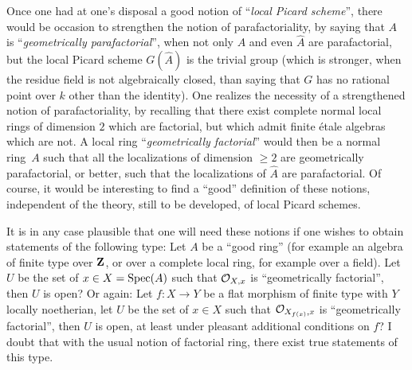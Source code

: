 \label{pXIII20}%
Once one had at one's disposal a good notion of ``\emph{local Picard scheme}'', there would be occasion to strengthen the notion of parafactoriality, by saying that $A$ is ``\emph{geometrically parafactorial}'', when not only $A$ and even $\widehat{A}$ are parafactorial, but the local Picard scheme $G(\widehat{A})$ is the trivial group (which is stronger, when the residue field is not algebraically closed, than saying that $G$ has no rational point over $k$ other than the identity). One realizes the necessity of a strengthened notion of parafactoriality, by recalling that there exist complete normal local rings of dimension $2$ which are factorial, but which admit finite \'etale algebras which are not. A local ring ``\emph{geometrically factorial}'' would then be a normal ring~$A$ such that all the localizations of dimension $\geq 2$ are geometrically parafactorial, or better, such that the localizations of $\widehat{A}$ are parafactorial. Of course, it would be interesting to find a ``good'' definition of these notions, independent of the theory, still to be developed, of local Picard schemes.

It is in any case plausible that one will need these notions if one wishes to obtain statements of the following type: Let $A$ be a ``good ring'' (for example an algebra of finite type over $\mathbf{Z}$, or over a complete local ring, for example over a field). Let~$U$ be the set of $x\in X=\operatorname{Spec}(A)$ such that $\mathcal{O}_{X, x}$ is ``geometrically factorial'', then $U$ is open? Or again: Let $f\colon X\to Y$ be a flat morphism of finite type with $Y$ locally noetherian, let $U$ be the set of $x\in X$ such that ${\mathcal O}_{X_{f(x)}, x}$ is ``geometrically factorial'', then $U$ is open, at least under pleasant additional conditions on $f$? I doubt that with the usual notion of factorial ring, there exist true statements of this type.

